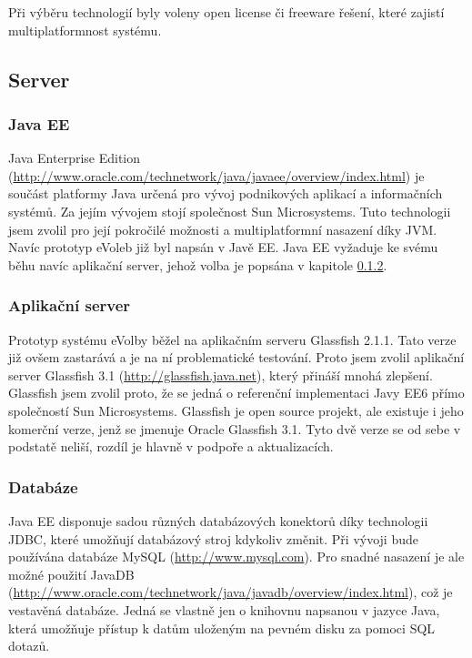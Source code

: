 \documentclass[11pt,twoside,a4paper]{book}
\begin{document}
Při výběru technologií byly voleny open license či freeware řešení, které zajistí multiplatformnost systému.

\subsection{Server}

\subsubsection{Java EE}

Java Enterprise Edition (\url{http://www.oracle.com/technetwork/java/javaee/overview/index.html}) je součást platformy Java určená pro vývoj podnikových aplikací a informačních systémů. Za jejím vývojem stojí společnost Sun Microsystems. Tuto technologii jsem zvolil pro její pokročilé možnosti a multiplatformní nasazení díky JVM.  Navíc prototyp eVoleb již byl napsán v Javě EE. Java EE vyžaduje ke svému běhu navíc aplikační server, jehož volba je popsána v kapitole \ref{aplikacni_server}. 

\subsubsection{Aplikační server} \label{aplikacni_server}

Prototyp systému eVolby\cite{www:prototyp} běžel na aplikačním serveru Glassfish 2.1.1. Tato verze již ovšem zastarává a je na ní problematické testování. Proto jsem zvolil aplikační server Glassfish 3.1 (\url{http://glassfish.java.net}), který přináší mnohá zlepšení. Glassfish jsem zvolil proto, že se jedná o referenční implementaci Javy EE6 přímo společností Sun Microsystems. Glassfish je open source projekt, ale existuje i jeho komerční verze, jenž se jmenuje Oracle Glassfish 3.1. Tyto dvě verze se od sebe v podstatě neliší, rozdíl je hlavně v podpoře a aktualizacích.

\subsubsection{Databáze}

Java EE disponuje sadou různých databázových konektorů díky technologii JDBC, které umožňují databázový stroj kdykoliv změnit. Při vývoji bude používána databáze MySQL (\url{http://www.mysql.com}). Pro snadné nasazení je ale možné použití JavaDB (\url{http://www.oracle.com/technetwork/java/javadb/overview/index.html}), což je vestavěná databáze. Jedná se vlastně jen o knihovnu napsanou v jazyce Java, která umožňuje přístup k datům uloženým na pevném disku za pomoci SQL dotazů.
\end{document}
